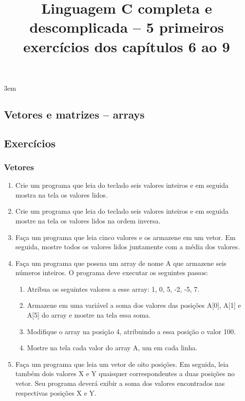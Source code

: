 \documentclass[a4paper,10pt]{article}
\title{Linguagem C completa e descomplicada -- 5 primeiros exercícios dos capítulos 6 ao 9}
\begin{document}
\maketitle

\emergencystretch 3em

\begin{multicols*}{2}
\setcounter{section}{5}
\section{Vetores e matrizes – arrays}

\setcounter{subsection}{6}
\subsection{Exercícios}

\subsubsection{Vetores}

\setlength{\leftmargini}{0pt}
\begin{enumerate}
  \item Crie um programa que leia do teclado seis valores inteiros e em seguida mostra na tela os valores lidos.
  \item Crie um programa que leia do teclado seis valores inteiros e em seguida mostre na tela os valores lidos na ordem inversa.
  \item Faça um programa que leia cinco valores e os armazene em um vetor. Em seguida, mostre todos os valores lidos juntamente com a média dos valores.
  \item Faça um programa que possua um array de nome A que armazene seis números inteiros. O programa deve executar os seguintes passos:

  \setlength{\leftmargini}{0pt}
  \begin{enumerate}
    \item Atribua os seguintes valores a esse array: 1, 0, 5, -2, -5, 7.
    \item Armazene em uma variável a soma dos valores das posições A[0], A[1] e A[5] do array e mostre na tela essa soma.
    \item Modifique o array na posição 4, atribuindo a essa posição o valor 100.
    \item Mostre na tela cada valor do array A, um em cada linha.
  \end{enumerate}

  \item Faça um programa que leia um vetor de oito posições. Em seguida, leia também dois valores X e Y quaisquer correspondentes a duas posições no vetor. Seu programa deverá exibir a soma dos valores encontrados nas respectivas posições X e Y.
\end{enumerate}


\end{multicols*}
\end{document}
